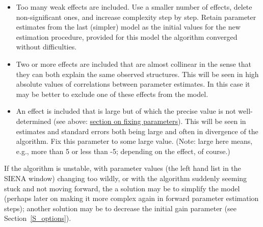 \documentclass[a4paper,fleqn]{article}
\newcommand{\+}{\, + \,}
\newcommand{\SI}{{\sf SIENA }}
\begin{document}
{\begin{itemize}
      Another possibility is that there is time heterogeneity.
      Indications about this can be gathered also from the descriptives
      given in the start of the output file: the number of changes
      upward and downward, in the network and also -- if any -- in the
      dependent behavioral variable. If these do not show a smooth
      or similar pattern across the observations, then it may be useful
      to include actor variables representing time trends. These
      could be smooth -- e.g., linear -- but they also could be dummy variables
      representing one or more observational periods; these must be included
      as an ego effect to represent time trends in the tendency to make ties
      (or to display higher values of the behavior in question).
\item Too many weak effects are included. Use a smaller number of effects,
      delete non-significant ones, and increase complexity step by step.
      Retain parameter estimates from the last
      (simpler) model as the initial values for the new estimation procedure,
      provided for this model the algorithm converged
      without difficulties.
\item Two or more effects are included that are almost collinear
      in the sense that they can both explain the same observed structures.
      This will be seen in high absolute values of
      correlations between parameter estimates.
      In this case it may be better to exclude one of these effects from the model.
\item An effect is included that is large but of which the precise
      value is not well-determined (see above:
      \hyperlink{T_fix}{section on fixing parameters}).
      This will be seen in estimates and standard errors both being large
      and often in divergence of the algorithm.
      Fix this parameter to some large value.
      (Note: large here means, e.g., more than 5 or less than -5; depending
      on the effect, of course.)
\end{itemize}

If the algorithm is unstable, with parameter values (the left hand list
in the \SI window) changing too wildly, or with the algorithm
suddenly seeming stuck and not moving forward, the a solution may be
to simplify the model (perhaps later on making it more complex again
in forward parameter estimation steps); another solution may be
to decrease the initial gain parameter (see Section~\ref{S_options}).

}
\end{document}

